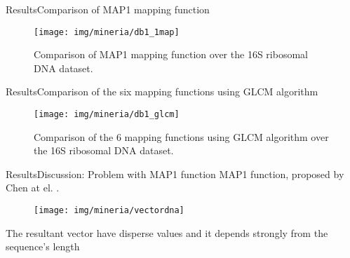 \documentclass[10pt]{beamer}
\newcommand{\1}{
	\setbeamertemplate{background}{
		\texttt{[image: img/1\_dna]}
		\tikz[overlay] \fill[fill opacity=0.75,fill=white] (0,0) rectangle (-\paperwidth,\paperheight);
	}
}
\begin{document}
\begin{frame}{Results}{Comparison of MAP1 mapping function}
	\begin{figure}[]
		\centering
		\texttt{[image: img/mineria/db1\_1map]}
		\caption{Comparison of MAP1 mapping function over the 16S ribosomal DNA dataset.}
		\label{img:comp3}
	\end{figure}
\end{frame}

\begin{frame}{Results}{Comparison of the six mapping functions using GLCM algorithm}
	\begin{figure}[]
		\centering
		\texttt{[image: img/mineria/db1\_glcm]}
		\caption{Comparison of the 6 mapping functions using GLCM algorithm over the 16S ribosomal DNA dataset.}
		\label{img:comp3}
	\end{figure}
\end{frame}


\begin{frame}{Results}{Discussion: Problem with MAP1 function}
	MAP1 function, proposed by Chen at el. \cite{chen2018use}.
	
	
	
			\begin{figure}[]
				\centering
				\texttt{[image: img/mineria/vectordna]}		
			\end{figure}
		
	

	\begin{block}{}
	The resultant vector have disperse values and it depends strongly from the sequence's length
	\end{block}
\end{frame}
\end{document}

